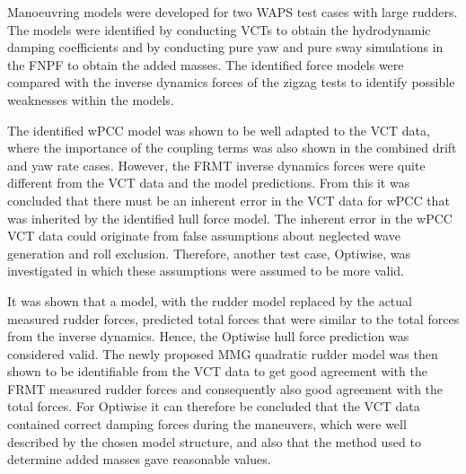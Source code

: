 %
\noindent Manoeuvring models were developed for two WAPS test cases with large rudders. The models were identified by conducting VCTs to obtain the hydrodynamic damping coefficients and by conducting pure yaw and pure sway simulations in the FNPF to obtain the added masses. The identified force models were compared with the inverse dynamics forces of the zigzag tests to identify possible weaknesses within the models.  

The identified wPCC model was shown to be well adapted to the VCT data, where the importance of the coupling terms was also shown in the combined drift and yaw rate cases.
However, the FRMT inverse dynamics forces were quite different from the VCT data and the model predictions. From this it was concluded that there must be an inherent error in the VCT data for wPCC that was inherited by the identified hull force model.
The inherent error in the wPCC VCT data could originate from false assumptions about neglected wave generation and roll exclusion. Therefore, another test case, Optiwise, was investigated in which these assumptions were assumed to be more valid.

It was shown that a model, with the rudder model replaced by the actual measured rudder forces, predicted total forces that were similar to the total forces from the inverse dynamics. Hence, the Optiwise hull force prediction was considered valid.
The newly proposed MMG quadratic rudder model was then shown to be identifiable from the VCT data to get good agreement with the FRMT measured rudder forces and consequently also good agreement with the total forces. 
For Optiwise it can therefore be concluded that the VCT data contained correct damping forces during the maneuvers, which were well described by the chosen model structure, and also that the method used to determine added masses gave reasonable values. 

